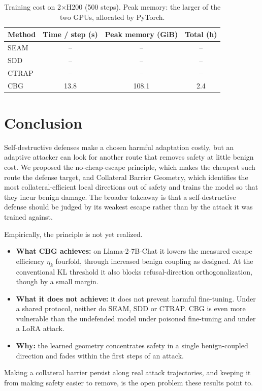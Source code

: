 \documentclass[11pt]{article}
\newcommand{\etak}{\eta_{k}}
\newcommand{\tbd}{\textcolor{gray}{--}}
\begin{document}
\begin{table}[t]
\centering
\small
\caption{Training cost on 2$\times$H200 (500 steps). Peak memory: the larger of the two GPUs, allocated by PyTorch.}
\label{tab:overhead}
\begin{tabular}{lccc}
\toprule
Method & Time / step (s) & Peak memory (GiB) & Total (h)\\
\midrule
SEAM   & \tbd & \tbd & \tbd\\
SDD    & \tbd & \tbd & \tbd\\
CTRAP  & \tbd & \tbd & \tbd\\
CBG    & 13.8 & 108.1 & 2.4\\
\bottomrule
\end{tabular}
\end{table}




\section{Conclusion}
\label{sec:conclusion}

Self-destructive defenses make a chosen harmful adaptation costly, but an adaptive attacker can look for another route that removes safety at little benign cost. We proposed the no-cheap-escape principle, which makes the cheapest such route the defense target, and Collateral Barrier Geometry, which identifies the most collateral-efficient local directions out of safety and trains the model so that they incur benign damage. The broader takeaway is that a self-destructive defense should be judged by its weakest escape rather than by the attack it was trained against.

Empirically, the principle is not yet realized.
\begin{itemize}
  \item \textbf{What CBG achieves:} on Llama-2-7B-Chat it lowers the measured escape efficiency $\etak$ fourfold, through increased benign coupling as designed. At the conventional KL threshold it also blocks refusal-direction orthogonalization, though by a small margin.
  \item \textbf{What it does not achieve:} it does not prevent harmful fine-tuning. Under a shared protocol, neither do SEAM, SDD or CTRAP. CBG is even more vulnerable than the undefended model under poisoned fine-tuning and under a LoRA attack.
  \item \textbf{Why:} the learned geometry concentrates safety in a single benign-coupled direction and fades within the first steps of an attack.
\end{itemize}
Making a collateral barrier persist along real attack trajectories, and keeping it from making safety easier to remove, is the open problem these results point to.
\end{document}
